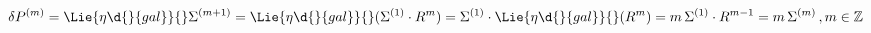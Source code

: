 \begin{equation*}
\delta P^{(m)} = \Lie{\eta\d{}{gal}}{}\Sigma^{(m+1)} =
\Lie{\eta\d{}{gal}}{}(\Sigma^{(1)}\cdot R^{m}) =  \Sigma^{(1)}\cdot
\Lie{\eta\d{}{gal}}{}(R^{m}) = {m}\,\Sigma^{(1)} \cdot R^{m-1} =
{m}\,\Sigma^{(m)}  \,,{{m}} \in {\mathbb{Z}}
\end{equation*}

